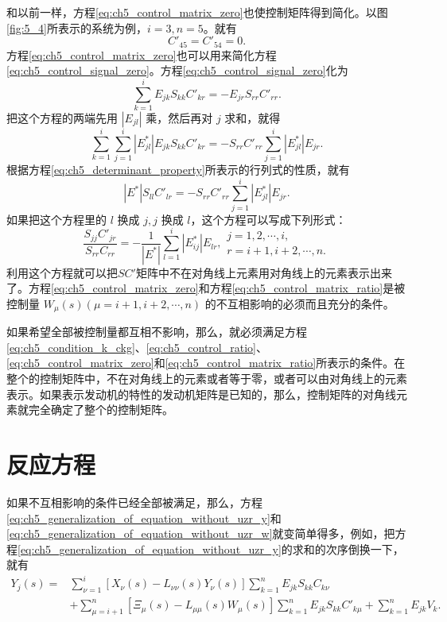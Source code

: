 和以前一样，方程\eqref{eq:ch5_control_matrix_zero}也使控制矩阵得到简化。以图\ref{fig:5_4}所表示的系统为例，$i=3, n=5$。就有
\begin{equation*}
C'_{45} = C'_{54} = 0.
\end{equation*}
方程\eqref{eq:ch5_control_matrix_zero}也可以用来简化方程\eqref{eq:ch5_control_signal_zero}。方程\eqref{eq:ch5_control_signal_zero}化为
\begin{equation*}
\sum_{k=1}^{i} E_{jk} S_{kk} C'_{kr} = -E_{jr} S_{rr} C'_{rr}.
\end{equation*}
把这个方程的两端先用 $|E_{jl}|$ 乘，然后再对 $j$ 求和，就得
\begin{equation*}
\sum_{k=1}^{i} \sum_{j=1}^{i} |E_{jl}^{*}| E_{jk} S_{kk} C'_{kr} = -S_{rr} C'_{rr} \sum_{j=1}^{i} |E_{jl}^{*}| E_{jr}.
\end{equation*}
根据方程\eqref{eq:ch5_determinant_property}所表示的行列式的性质，就有
\begin{equation*}
|E^{*}| S_{ll} C'_{lr} = -S_{rr} C'_{rr} \sum_{j=1}^{i} |E_{jl}^{*}| E_{jr}.
\end{equation*}
如果把这个方程里的 $l$ 换成 $j, j$ 换成 $l$，这个方程可以写成下列形式：
\begin{equation}\label{eq:ch5_control_matrix_ratio}
\frac{S_{jj} C'_{jr}}{S_{rr} C_{rr}} = -\frac{1}{|E^{*}|} \sum_{l=1}^{i} |E_{ij}^{*}| E_{lr}, 
\left. 
\begin{array}{l}
j=1, 2, \cdots, i,\\
r=i+1, i+2, \cdots, n.
\end{array} 
\right.
\end{equation}
利用这个方程就可以把$SC'$矩阵中不在对角线上元素用对角线上的元素表示出来了。方程\eqref{eq:ch5_control_matrix_zero}和方程\eqref{eq:ch5_control_matrix_ratio}是被控制量 $W_\mu(s)(\mu=i+1,i+2,\cdots,n)$ 的不互相影响的必须而且充分的条件。

如果希望全部被控制量都互相不影响，那么，就必须满足方程\eqref{eq:ch5_condition_k_ckg}、\eqref{eq:ch5_control_ratio}、\eqref{eq:ch5_control_matrix_zero}和\eqref{eq:ch5_control_matrix_ratio}所表示的条件。在整个的控制矩阵中，不在对角线上的元素或者等于零，或者可以由对角线上的元素表示。如果表示发动机的特性的发动机矩阵是已知的，那么，控制矩阵的对角线元素就完全确定了整个的控制矩阵。

\section{反应方程}

如果不互相影响的条件已经全部被满足，那么，方程\eqref{eq:ch5_generalization_of_equation_without_uzr_y}和\eqref{eq:ch5_generalization_of_equation_without_uzr_w}就变简单得多，例如，把方程\eqref{eq:ch5_generalization_of_equation_without_uzr_y}的求和的次序倒换一下，就有
\begin{equation*}
\begin{array}{ll}
Y_j(s) = & \sum_{\nu=1}^{i} [X_\nu(s) - L_{\nu\nu}(s)Y_\nu(s)]\sum_{k=1}^{n} E_{jk}S_{kk}C_{k\nu}\\
		 & + \sum_{\mu=i+1}^{n} [\Xi_\mu(s) - L_{\mu\mu}(s)W_\mu(s)]\sum_{k=1}^{n} E_{jk}S_{kk}C'_{k\mu} + \sum_{k=1}^{n} E_{jk}V_k.
\end{array}
\end{equation*}

